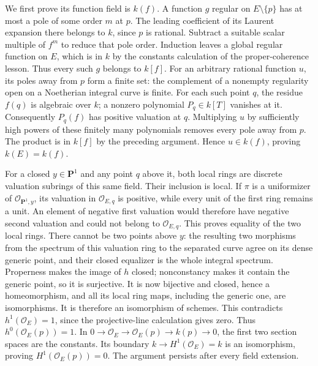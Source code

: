 \documentclass[11pt]{article}
\begin{document}
We first prove its function field is \(k(f)\). A function \(g\) regular
on \(E\setminus\{p\}\) has at most a pole of some order \(m\) at \(p\).
The leading coefficient of its Laurent expansion there belongs to \(k\),
since \(p\) is rational. Subtract a suitable scalar multiple of \(f^m\)
to reduce that pole order. Induction leaves a global regular function on
\(E\), which is in \(k\) by the constants calculation of the
proper-coherence lesson. Thus every such \(g\) belongs to \(k[f]\). For
an arbitrary rational function \(u\), its poles away from \(p\) form a
finite set: the complement of a nonempty regularity open on a Noetherian
integral curve is finite. For each such point \(q\), the residue
\(f(q)\) is algebraic over \(k\); a nonzero polynomial \(P_q\in k[T]\)
vanishes at it. Consequently \(P_q(f)\) has positive valuation at \(q\).
Multiplying \(u\) by sufficiently high powers of these finitely many
polynomials removes every pole away from \(p\). The product is in
\(k[f]\) by the preceding argument. Hence \(u\in k(f)\), proving
\(k(E)=k(f)\).

For a closed \(y\in\mathbf P^1\) and any point \(q\) above it, both
local rings are discrete valuation subrings of this same field. Their
inclusion is local. If \(\pi\) is a uniformizer of
\(\mathcal O_{\mathbf P^1,y}\), its valuation in \(\mathcal O_{E,q}\) is
positive, while every unit of the first ring remains a unit. An element
of negative first valuation would therefore have negative second
valuation and could not belong to \(\mathcal O_{E,q}\). This proves
equality of the two local rings. There cannot be two points above \(y\):
the resulting two morphisms from the spectrum of this valuation ring to
the separated curve agree on its dense generic point, and their closed
equalizer is the whole integral spectrum. Properness makes the image of
\(h\) closed; nonconstancy makes it contain the generic point, so it is
surjective. It is now bijective and closed, hence a homeomorphism, and
all its local ring maps, including the generic one, are isomorphisms. It
is therefore an isomorphism of schemes. This contradicts
\(h^1(\mathcal O_E)=1\), since the projective-line calculation gives
zero. Thus \(h^0(\mathcal O_E(p))=1\). In
\(0\to\mathcal O_E\to\mathcal O_E(p)\to k(p)\to0\), the first two
section spaces are the constants. Its boundary
\(k\to H^1(\mathcal O_E)=k\) is an isomorphism, proving
\(H^1(\mathcal O_E(p))=0\). The argument persists after every field
extension.
\end{document}
